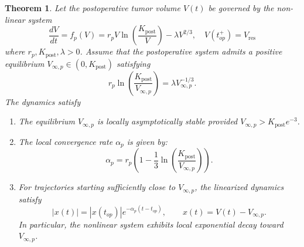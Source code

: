 \documentclass[11pt, reqno]{amsart}
\numberwithin{equation}{section}
\newtheorem{theorem}{Theorem}[section]
\theoremstyle{definition}
\begin{document}
\begin{theorem}
\label{thm:postop_dynamics}
Let the postoperative tumor volume $V(t)$ be governed by the non-linear system
\begin{equation}
\frac{dV}{dt} = f_p(V) = r_p V \ln\left(\frac{K_{\text{post}}}{V}\right) - \lambda V^{2/3}, \quad V(t_{op}^+) = V_{\text{res}}
\end{equation}
where $r_p, K_{\text{post}}, \lambda > 0$. Assume that the postoperative system admits a positive equilibrium
$V_{\infty,p}\in(0,K_{\text{post}})$ satisfying
\[
r_p\ln\left(\frac{K_{\text{post}}}{V_{\infty,p}}\right)
=\lambda V_{\infty,p}^{-1/3}.
\]
The dynamics satisfy
\begin{enumerate}
    \item[(i)] %
    The equilibrium $V_{\infty, p}$ is locally asymptotically stable provided $V_{\infty, p} > K_{\text{post}}e^{-3}$.
    \vspace{0.15cm}
    
    \item[(ii)] %
    The local convergence rate $\alpha_p$ is given by:
    \begin{equation}
    \alpha_p = r_p \left( 1 - \frac{1}{3} \ln \left( \frac{K_{\text{post}}}{V_{\infty, p}} \right) \right).
    \end{equation}
  \item[(iii)] %
   For trajectories starting sufficiently close to $V_{\infty,p}$, the
linearized dynamics satisfy
\[
|x(t)| = |x(t_{op})| e^{-\alpha_p (t-t_{op})},
\qquad x(t)=V(t)-V_{\infty,p}.
\]
In particular, the nonlinear system exhibits local exponential decay toward $V_{\infty,p}$.
\end{enumerate}
\end{theorem}
\end{document}
